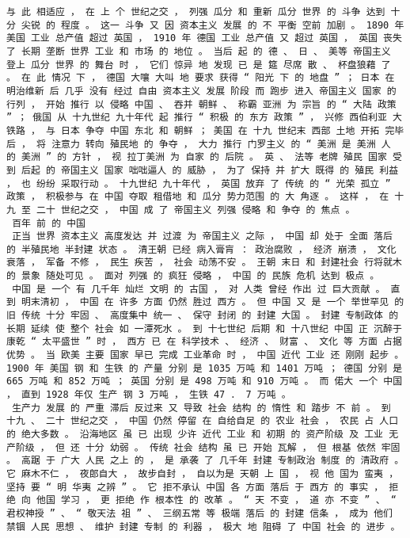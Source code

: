 \documentclass{article}
\begin{document}
\begin{Verbatim}[commandchars=\\\{\}]
 与 此 相适应 ， 在 上 个 世纪之交 ， 列强 瓜分 和 重新 瓜分 世界 的 斗争 达到 十分 尖锐 的 程度 。 这一 斗争 又 因 资本主义 发展 的 不 平衡 空前 加剧 。 1890 年 美国 工业 总产值 超过 英国 ， 1910 年 德国 工业 总产值 又 超过 英国 ， 英国 丧失 了 长期 垄断 世界 工业 和 市场 的 地位 。 当后 起 的 德 、 日 、 美等 帝国主义 登上 瓜分 世界 的 舞台 时 ， 它们 惊异 地 发现 已 是 筵 尽席 散 、 杯盘狼藉 了 。 在 此 情况 下 ， 德国 大嚷 大叫 地 要求 获得 “ 阳光 下 的 地盘 ” ； 日本 在 明治维新 后 几乎 没有 经过 自由 资本主义 发展 阶段 而 跑步 进入 帝国主义 国家 的 行列 ， 开始 推行 以 侵略 中国 、 吞并 朝鲜 、 称霸 亚洲 为 宗旨 的 “ 大陆 政策 ” ； 俄国 从 十九世纪 九十年代 起 推行 “ 积极 的 东方 政策 ” ， 兴修 西伯利亚 大 铁路 ， 与 日本 争夺 中国 东北 和 朝鲜 ； 美国 在 十九 世纪末 西部 土地 开拓 完毕 后 ， 将 注意力 转向 殖民地 的 争夺 ， 大力 推行 门罗主义 的 “ 美洲 是 美洲 人 的 美洲 ” 的 方针 ， 视 拉丁美洲 为 自家 的 后院 。 英 、 法等 老牌 殖民 国家 受到 后起 的 帝国主义 国家 咄咄逼人 的 威胁 ， 为了 保持 并 扩大 既得 的 殖民 利益 ， 也 纷纷 采取行动 。 十九世纪 九十年代 ， 英国 放弃 了 传统 的 “ 光荣 孤立 ” 政策 ， 积极参与 在 中国 夺取 租借地 和 瓜分 势力范围 的 大 角逐 。 这样 ， 在 十九 至 二十 世纪之交 ， 中国 成 了 帝国主义 列强 侵略 和 争夺 的 焦点 。 
 百年 前 的 中国 
 正当 世界 资本主义 高度发达 并 过渡 为 帝国主义 之际 ， 中国 却 处于 全面 落后 的 半殖民地 半封建 状态 。 清王朝 已经 病入膏肓 ： 政治腐败 ， 经济 崩溃 ， 文化 衰落 ， 军备 不修 ， 民生 疾苦 ， 社会 动荡不安 。 王朝 末日 和 封建社会 行将就木 的 景象 随处可见 。 面对 列强 的 疯狂 侵略 ， 中国 的 民族 危机 达到 极点 。 
 中国 是 一个 有 几千年 灿烂 文明 的 古国 ， 对 人类 曾经 作出 过 巨大贡献 。 直到 明末清初 ， 中国 在 许多 方面 仍然 胜过 西方 。 但 中国 又 是 一个 举世罕见 的 旧 传统 十分 牢固 、 高度集中 统一 、 保守 封闭 的 封建 大国 。 封建 专制政体 的 长期 延续 使 整个 社会 如 一潭死水 。 到 十七世纪 后期 和 十八世纪 中国 正 沉醉于 康乾 “ 太平盛世 ” 时 ， 西方 已 在 科学技术 、 经济 、 财富 、 文化 等 方面 占据 优势 。 当 欧美 主要 国家 早已 完成 工业革命 时 ， 中国 近代 工业 还 刚刚 起步 。 1900 年 美国 钢 和 生铁 的 产量 分别 是 1035 万吨 和 1401 万吨 ； 德国 分别 是 665 万吨 和 852 万吨 ； 英国 分别 是 498 万吨 和 910 万吨 。 而 偌大 一个 中国 ， 直到 1928 年仅 生产 钢 3 万吨 ， 生铁 47 ． 7 万吨 。 
 生产力 发展 的 严重 滞后 反过来 又 导致 社会 结构 的 惰性 和 踏步 不 前 。 到 十九 、 二十 世纪之交 ， 中国 仍然 停留 在 自给自足 的 农业 社会 ， 农民 占 人口 的 绝大多数 。 沿海地区 虽 已 出现 少许 近代 工业 和 初期 的 资产阶级 及 工业 无产阶级 ， 但 还 十分 幼弱 。 传统 社会 结构 虽 已 开始 瓦解 ， 但 根基 依然 牢固 。 高踞 于 广大 人民 之上 的 ， 是 承袭 了 几千年 封建 专制政治 制度 的 清政府 。 它 麻木不仁 ， 夜郎自大 ， 故步自封 ， 自以为是 天朝 上 国 ， 视 他 国为 蛮夷 ， 坚持 要 “ 明 华夷 之辨 ” 。 它 拒不承认 中国 各 方面 落后 于 西方 的 事实 ， 拒绝 向 他国 学习 ， 更 拒绝 作 根本性 的 改革 。 “ 天 不变 ， 道 亦 不变 ” 、 “ 君权神授 ” 、 “ 敬天法 祖 ” 、 三纲五常 等 极端 落后 的 封建 信条 ， 成为 他们 禁锢 人民 思想 、 维护 封建 专制 的 利器 ， 极大 地 阻碍 了 中国 社会 的 进步 。 

\end{Verbatim}
\end{document}
